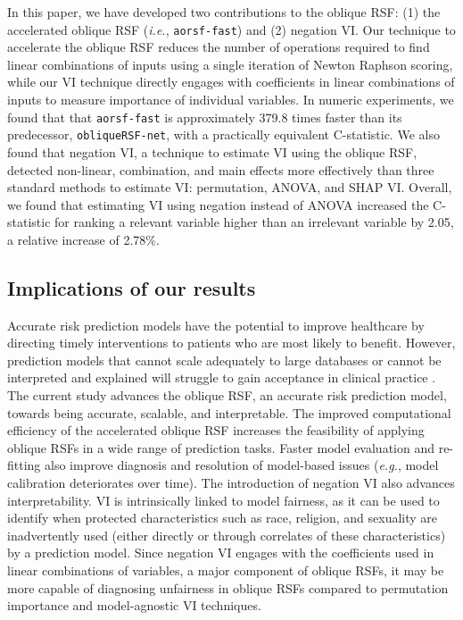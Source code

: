 \documentclass{article}\usepackage[]{graphicx}\usepackage[]{xcolor}
\newcommand{\ie}{\textit{i.e.}}
\newcommand{\eg}{\textit{e.g.}}
\begin{document}
In this paper, we have developed two contributions to the oblique RSF: (1) the accelerated oblique RSF (\ie, \texttt{aorsf-fast}) and (2) negation VI. Our technique to accelerate the oblique RSF reduces the number of operations required to find linear combinations of inputs using a single iteration of Newton Raphson scoring, while our VI technique directly engages with coefficients in linear combinations of inputs to measure importance of individual variables. In numeric experiments, we found that that \texttt{aorsf-fast} is approximately 379.8 times faster than its predecessor, \texttt{obliqueRSF-net}, with a practically equivalent C-statistic. We also found that negation VI, a technique to estimate VI using the oblique RSF, detected non-linear, combination, and main effects more effectively than three standard methods to estimate VI: permutation, ANOVA, and SHAP VI. Overall, we found that estimating VI using negation instead of ANOVA increased the C-statistic for ranking a relevant variable higher than an irrelevant variable by 2.05, a relative increase of 2.78\%.

\subsection{Implications of our results}

Accurate risk prediction models have the potential to improve healthcare by directing timely interventions to patients who are most likely to benefit. However, prediction models that cannot scale adequately to large databases or cannot be interpreted and explained will struggle to gain acceptance in clinical practice \citep{moss2022demystifying}. The current study advances the oblique RSF, an accurate risk prediction model, towards being accurate, scalable, and interpretable. The improved computational efficiency of the accelerated oblique RSF increases the feasibility of applying oblique RSFs in a wide range of prediction tasks. Faster model evaluation and re-fitting also improve diagnosis and resolution of model-based issues (\eg, model calibration deteriorates over time). The introduction of negation VI also advances interpretability. VI is intrinsically linked to model fairness, as it can be used to identify when protected characteristics such as race, religion, and sexuality are inadvertently used (either directly or through correlates of these characteristics) by a prediction model. Since negation VI engages with the coefficients used in linear combinations of variables, a major component of oblique RSFs, it may be more capable of diagnosing unfairness in oblique RSFs compared to permutation importance and model-agnostic VI techniques.
\end{document}
